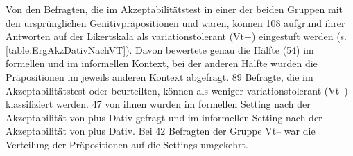 Von den Befragten, die im Akzeptabilitätstest in einer der beiden Gruppen mit den ursprünglichen Genitivpräpositionen \wegen{} und \waehrend{} waren, können 108 aufgrund ihrer Antworten auf der Likertskala als variationstolerant (Vt+) eingestuft werden (s. \autoref{table:ErgAkzDativNachVT}).
Davon bewertete genau die Hälfte (54) \wegen{} im formellen und \waehrend{} im informellen Kontext, bei der anderen Hälfte wurden die Präpositionen im jeweils anderen Kontext abgefragt. 
89 Befragte, die im Akzeptabilitätstest \wegen{} oder \waehrend{} beurteilten, können als weniger variationstolerant (Vt--) klassifiziert werden.
47 von ihnen wurden im formellen Setting nach der Akzeptabilität von \wegen{} plus Dativ gefragt und im informellen Setting nach der Akzeptabilität von \waehrend{} plus Dativ. 
Bei 42 Befragten der Gruppe Vt-- war die Verteilung der Präpositionen auf die Settings umgekehrt. 
